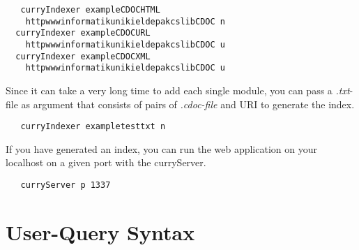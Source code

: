 \documentclass[%
	pdftex,%
	a4paper,%
	oneside,%
	chapterprefix,%
	headsepline,%
	12pt%
]{scrbook}
\begin{document}
\begin{tabbing}\tt
~~curryIndexer~exampleCDOCHTML~\\
\tt ~~~~httpwwwinformatikunikieldepakcslibCDOC~n\\
\tt ~~curryIndexer~exampleCDOCURL~\\
\tt ~~~~httpwwwinformatikunikieldepakcslibCDOC~u\\
\tt ~~curryIndexer~exampleCDOCXML~\\
\tt ~~~~httpwwwinformatikunikieldepakcslibCDOC~u
\end{tabbing}

Since it can take a very long time to add each single module, you can
pass a \emph{.txt}-file as argument that consists of pairs of \emph{.cdoc-file} and
URI to generate the index.

\begin{tabbing}\tt
~~curryIndexer~exampletesttxt~n
\end{tabbing}

If you have generated an index, you can run the web application on your
localhost on a given port with the curryServer.

\begin{tabbing}\tt
~~curryServer~p~1337
\end{tabbing}

\chapter{User-Query Syntax}\label{a:syntax}



% 
\end{document}
